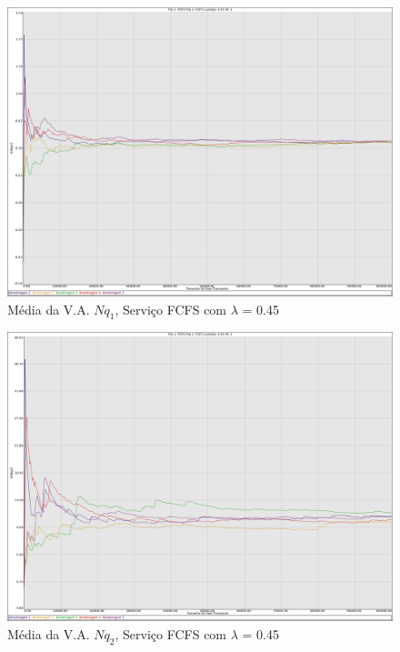 \documentclass[a4paper,10pt]{article}
\begin{document}
\begin{figure}
	\caption{Média da V.A. $Nq_1$, Serviço FCFS com $\lambda$ = 0.45}
	\label{figTransienteFCFSfila1Nq}
	\includegraphics[scale = 0.20]{./graficos_transiente_1/FCFS/03.png}
\end{figure}

\begin{figure}
	\caption{Média da V.A. $Nq_2$, Serviço FCFS com $\lambda$ = 0.45}
	\label{figTransienteFCFSfila2Nq}
	\includegraphics[scale = 0.20]{./graficos_transiente_1/FCFS/04.png}
\end{figure}
\end{document}
